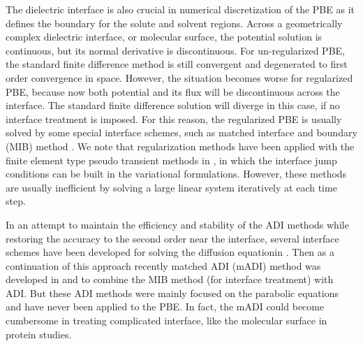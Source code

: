 The dielectric interface is also crucial in numerical discretization of the PBE as it defines the boundary for the solute and solvent regions. Across a geometrically complex dielectric interface, or molecular surface, the potential solution is continuous, but its normal derivative is discontinuous. For un-regularized PBE, the standard finite difference method is still convergent and  degenerated to first order convergence in space. However, the situation becomes worse for regularized PBE, because now both potential and its flux will be discontinuous across the interface. The standard finite difference solution will diverge in this case, if no interface treatment is imposed. For this reason, the regularized PBE is usually solved by some special interface schemes, such as matched interface and boundary (MIB) method \cite{Geng2007,Chen2011,Yu2007,ZHAO2004,ZHOU2006,ZHOU2006_high,YU2007_3D}. We note that regularization methods have been applied with the finite element type pseudo transient methods in \cite{DENG2018}, in which the interface jump conditions can be built in the variational formulations. However, these methods are usually inefficient by solving a large linear system iteratively at each time step. 

In an attempt to maintain the efficiency and stability of the ADI methods while restoring the accuracy to the second order near the interface, several interface schemes have been developed for solving the diffusion equationin \cite{Li1999,Liu2013}. Then as a continuation of this approach recently matched ADI (mADI) method was developed in \cite{Zhao2015} and \cite{Li2017} to combine the MIB method (for interface treatment) with ADI. But these ADI methods were mainly focused on the parabolic equations and have never been applied to the PBE. In fact, the mADI \cite{Zhao2015} could become cumbersome in treating complicated interface, like the molecular surface in protein studies. 

